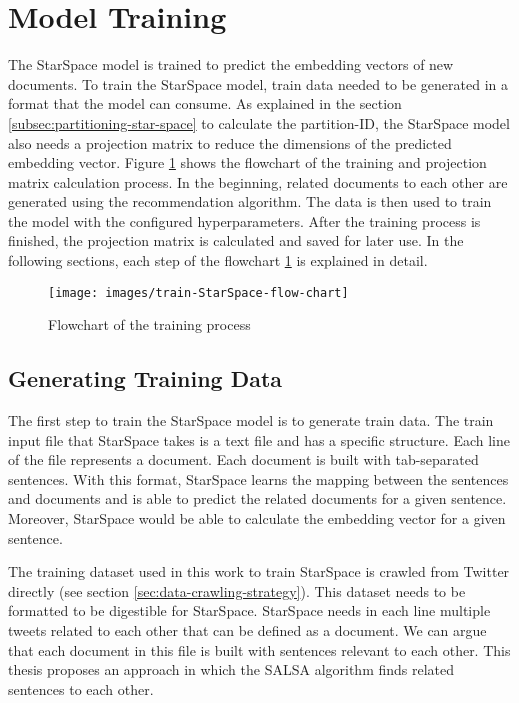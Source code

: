 \section{Model Training}
\label{sec:model-training}
The StarSpace model is trained to predict the embedding vectors of new documents. To train the StarSpace model, train data needed to be generated in a format that the model can consume. As explained in the section \ref{subsec:partitioning-star-space} to calculate the partition-ID, the StarSpace model also needs a projection matrix to reduce the dimensions of the predicted embedding vector. Figure \ref{fig:star-space-training} shows the flowchart of the training and projection matrix calculation process. In the beginning, related documents to each other are generated using the recommendation algorithm. The data is then used to train the model with the configured hyperparameters. After the training process is finished, the projection matrix is calculated and saved for later use. In the following sections, each step of the flowchart \ref{fig:star-space-training} is explained in detail.

\begin{figure}[!ht]
    \centering
    \texttt{[image: images/train-StarSpace-flow-chart]}
    \caption{Flowchart of the training process}
    \label{fig:star-space-training}
\end{figure}

\subsection{Generating Training Data}
\label{subsec:generating-training-data}
The first step to train the StarSpace model is to generate train data. The train input file that StarSpace takes is a text file and has a specific structure. Each line of the file represents a document. Each document is built with tab-separated sentences. With this format, StarSpace learns the mapping between the sentences and documents and is able to predict the related documents for a given sentence. Moreover, StarSpace would be able to calculate the embedding vector for a given sentence.


The training dataset used in this work to train StarSpace is crawled from Twitter directly (see section \ref{sec:data-crawling-strategy}). This dataset needs to be formatted to be digestible for StarSpace. StarSpace needs in each line multiple tweets related to each other that can be defined as a document. We can argue that each document in this file is built with sentences relevant to each other. This thesis proposes an approach in which the SALSA algorithm finds related sentences to each other.


